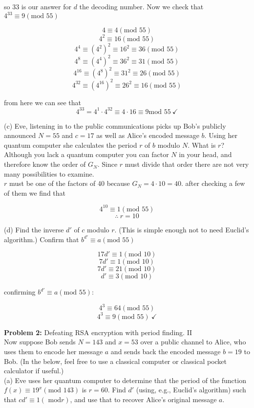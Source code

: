 so 33 is our answer for $d$ the decoding number. Now we check that
$4^{33}\equiv9(\text{mod }55)$

$$4\equiv4(\text{mod }55)$$
$$4^2\equiv16(\text{mod }55)$$
$$4^4\equiv(4^2)^2\equiv16^2\equiv36(\text{mod }55)$$
$$4^8\equiv(4^4)^2\equiv36^2\equiv31(\text{mod }55)$$
$$4^{16}\equiv(4^8)^2\equiv31^2\equiv26(\text{mod }55)$$
$$4^{32}\equiv(4^{16})^2\equiv26^2\equiv16(\text{mod }55)$$

from here we can see that
$$4^{33}=4^1\cdot4^{32}\equiv 4\cdot 16\equiv9\text{mod }55~\checkmark$$

(c) Eve, listening in to the public communications picks up Bob's publicly
announced $N=55$ and $c=17$ as well as Alice's encoded message $b$. Using her
quantum computer she calculates the period $r$ of $b$ modulo $N$. What is
$r$? Although you lack a quantum computer you can factor $N$ in your head, and
therefore know the order of $G_N$. Since $r$ must divide that order there are
not very many possibilities to examine.\\

$r$ must be one of the factors of 40 because $G_N=4\cdot10=40$. after
checking a few of them we find that

$$4^{10}\equiv1(\text{mod }55)$$
$$\therefore ~r=10$$

(d) Find the inverse $d'$ of $c$ modulo $r$. (This is simple enough not to
need Euclid's algorithm.) Confirm that $b^{d'}\equiv a(\text{mod }55)$

$$17d'\equiv1(\text{mod }10)$$
$$7d'\equiv1(\text{mod }10)$$
$$7d'\equiv21(\text{mod }10)$$
$$d'\equiv3(\text{mod }10)$$

confirming $b^{d'}\equiv a(\text{mod }55)$:

$$4^3\equiv64(\text{mod }55)$$
$$4^3\equiv9(\text{mod }55)~\checkmark$$

\textbf{Problem 2:} Defeating RSA encryption with period finding. II\\
Now suppose Bob sends $N=143$ and $x=53$ over a public channel to Alice, who
uses them to encode her message $a$ and sends back the encoded message
$b=19$ to Bob. (In the below, feel free to use a classical computer or
classical pocket calculator if useful.)\\

(a) Eve uses her quantum computer to determine that the period of the
function $f(x)\equiv19^x(\text{mod }143)$ is $r=60$. Find $d'$ (using, e.g.,
Euclid's algorithm) such that $cd'\equiv1(\text{ mod}r)$, and use that to
recover Alice's original message $a$.\\


